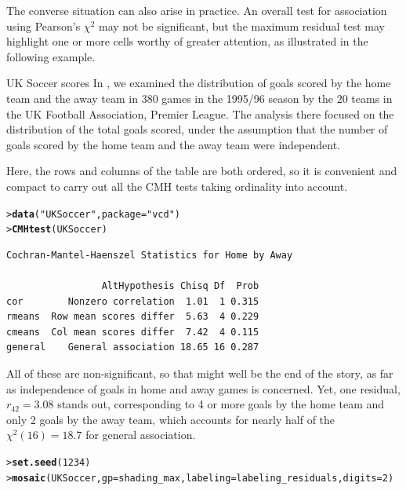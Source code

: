 \documentclass[10pt,krantz2]{krantz}\usepackage[]{graphicx}\usepackage[]{color}
\makeatletter
\newcommand{\hlnum}[1]{\textcolor[rgb]{0.686,0.059,0.569}{#1}}%
\newcommand{\hlstr}[1]{\textcolor[rgb]{0.192,0.494,0.8}{#1}}%
\newcommand{\hlstd}[1]{\textcolor[rgb]{0.345,0.345,0.345}{#1}}%
\newcommand{\hlkwc}[1]{\textcolor[rgb]{0.333,0.667,0.333}{#1}}%
\newcommand{\hlkwd}[1]{\textcolor[rgb]{0.737,0.353,0.396}{\textbf{#1}}}%
\newenvironment{kframe}{%
 \def\at@end@of@kframe{}%
 \ifinner\ifhmode%
  \def\at@end@of@kframe{\end{minipage}}%
  \begin{minipage}{\columnwidth}%
 \fi\fi%
 \def\FrameCommand##1{\hskip\@totalleftmargin \hskip-\fboxsep
 \colorbox{shadecolor}{##1}\hskip-\fboxsep
     \hskip-\linewidth \hskip-\@totalleftmargin \hskip\columnwidth}%
 \MakeFramed {\advance\hsize-\width
   \@totalleftmargin\z@ \linewidth\hsize
   \@setminipage}}%
 {\par\unskip\endMakeFramed%
 \at@end@of@kframe}
\newenvironment{knitrout}{}{} %
\renewenvironment{knitrout}{\small\renewcommand{\baselinestretch}{.85}}{} %
\makeatother
\begin{document}
The converse situation can also arise in practice. An overall test for association
using Pearson's $\chi^2$ may not be significant, but the maximum residual test
may highlight one or more cells worthy of greater attention, as illustrated in
the following example.


\begin{Example}[soccer2]{UK Soccer scores}
In , we examined the distribution of goals scored
by the home team and the away team in 380 games in the 1995/96 season
by the 20 teams in the UK Football Association, Premier League.
The analysis there focused on the distribution of the total goals
scored, under the assumption that the number of goals scored by
the home team and the away team were independent.

Here, the rows and columns of the table  are both ordered,
so it is convenient and compact to carry out all the CMH tests taking
ordinality into account.
\begin{knitrout}
\color{fgcolor}\begin{kframe}
\begin{alltt}
\hlstd{> }\hlkwd{data}\hlstd{(}\hlstr{"UKSoccer"}\hlstd{,} \hlkwc{package} \hlstd{=} \hlstr{"vcd"}\hlstd{)}
\hlstd{> }\hlkwd{CMHtest}\hlstd{(UKSoccer)}
\end{alltt}
\begin{verbatim}
Cochran-Mantel-Haenszel Statistics for Home by Away 

                 AltHypothesis Chisq Df  Prob
cor        Nonzero correlation  1.01  1 0.315
rmeans  Row mean scores differ  5.63  4 0.229
cmeans  Col mean scores differ  7.42  4 0.115
general    General association 18.65 16 0.287
\end{verbatim}
\end{kframe}
\end{knitrout}
All of these are non-significant, so that might well be the end of the story,
as far as independence of goals in home and away games is concerned. Yet, one
residual, $r_{42} = 3.08$ stands out, corresponding to 4 or more goals by
the home team and only 2 goals by the away team, which accounts for nearly
half of the $\chi^2 (16) = 18.7$ for general association.

\begin{knitrout}
\color{fgcolor}\begin{kframe}
\begin{alltt}
\hlstd{> }\hlkwd{set.seed}\hlstd{(}\hlnum{1234}\hlstd{)}
\hlstd{> }\hlkwd{mosaic}\hlstd{(UKSoccer,} \hlkwc{gp} \hlstd{= shading_max,} \hlkwc{labeling} \hlstd{= labeling_residuals,} \hlkwc{digits} \hlstd{=} \hlnum{2}\hlstd{)}
\end{alltt}
\end{kframe}\begin{figure}[!htbp]


\end{figure}
\end{knitrout}
\end{Example}
\end{document}
